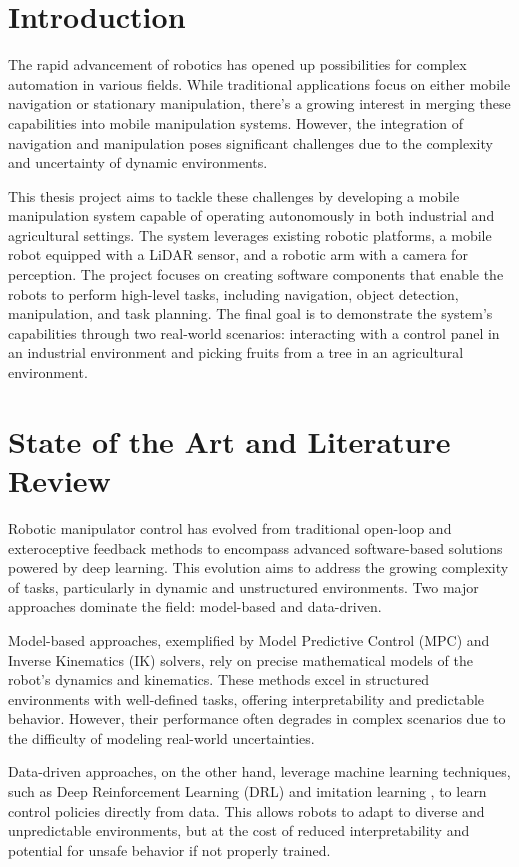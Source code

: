 
\section{Introduction}

The rapid advancement of robotics has opened up possibilities for complex automation in various fields. 
While traditional applications focus on either mobile navigation or stationary manipulation, 
there's a growing interest in merging these capabilities into mobile manipulation systems. 
However, the integration of navigation and manipulation poses significant challenges due to the complexity
and uncertainty of dynamic environments.

This thesis project aims to tackle these challenges by developing a mobile manipulation system capable of 
operating autonomously in both industrial and agricultural settings. The system leverages existing robotic platforms,
a mobile robot equipped with a LiDAR sensor, and a robotic arm with a camera for perception. The project focuses 
on creating software components that enable the robots to perform high-level tasks, including navigation, object detection, 
manipulation, and task planning. The final goal is to demonstrate the system's capabilities through two real-world 
scenarios: interacting with a control panel in an industrial environment and picking fruits from a tree in an 
agricultural environment.

\section{State of the Art and Literature Review}

Robotic manipulator control has evolved from traditional open-loop and exteroceptive feedback methods to encompass
advanced software-based solutions powered by deep learning. This evolution aims to address the growing complexity of tasks,
particularly in dynamic and unstructured environments. Two major approaches dominate the field: model-based and data-driven.

Model-based approaches, exemplified by Model Predictive Control (MPC) and Inverse Kinematics (IK) solvers, rely on precise 
mathematical models of the robot's dynamics and kinematics. These methods excel in structured environments with well-defined 
tasks, offering interpretability and predictable behavior. However, their performance often degrades in complex scenarios
due to the difficulty of modeling real-world uncertainties.

Data-driven approaches, on the other hand, leverage machine learning techniques, such as Deep Reinforcement Learning (DRL)
\cite{wang2022multitask} and imitation learning \cite{tony2024mobile}, to learn control policies directly from data. 
This allows robots to adapt to diverse and 
unpredictable environments, but at the cost of reduced interpretability and potential for unsafe behavior if not properly trained.

